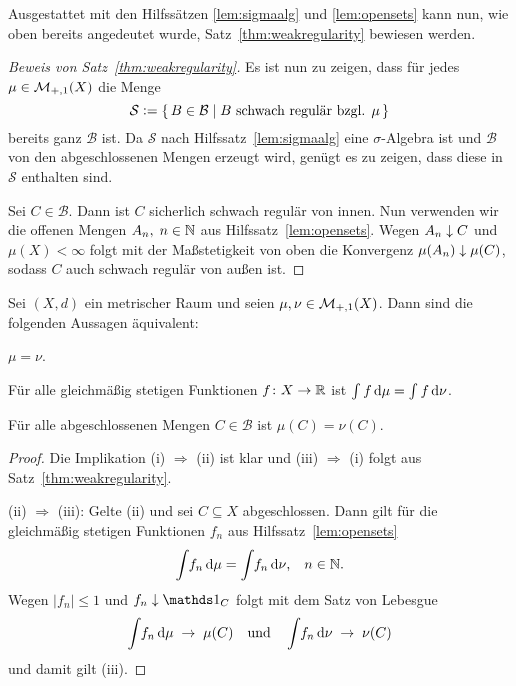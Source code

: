 \documentclass[../main/main.tex]{subfiles}
\begin{document}
	Ausgestattet mit den Hilfssätzen \ref{lem:sigmaalg} und \ref{lem:opensets} kann nun, 
	wie oben bereits angedeutet wurde, Satz~\ref{thm:weakregularity} bewiesen werden.

	\begin{proof}[Beweis von Satz~\ref{thm:weakregularity}]
		Es ist nun zu zeigen, dass für jedes $\mu \in \mathcal{M}_{+,1}(X)$
		die Menge 
		$$\mathcal{S} \vcentcolon = \left\{\, B \in \mathcal{B} \; | \; B \text{ schwach regulär bzgl. } \mu \,\right\}$$
		bereits ganz $\mathcal{B}$ ist. 
		Da $\mathcal{S}$ nach Hilfssatz~\ref{lem:sigmaalg} eine $\sigma$-Algebra ist und 
		$\mathcal{B}$ von den abgeschlossenen Mengen erzeugt wird, genügt es zu zeigen, 
		dass diese in $\mathcal{S}$ enthalten sind. 
		
		Sei $C \in \mathcal{B}$. Dann ist $C$ sicherlich schwach regulär von innen. 
		Nun verwenden wir die offenen Mengen $A_n, \; n \in \mathbb{N}$ aus Hilfssatz~\ref{lem:opensets}. 
		Wegen $A_n \downarrow C$ und $\mu(X) < \infty$ folgt mit der Maßstetigkeit von oben die Konvergenz $\mu(A_n) \downarrow \mu(C)$,
		sodass $C$ auch schwach regulär von außen ist.
	\end{proof}

	\begin{Satz}
		Sei $(X,d)$ ein metrischer Raum und seien $\mu, \nu \in \mathcal{M}_{+,1}(X)$. Dann sind die folgenden Aussagen äquivalent:
		\begin{equivalentthm}
			\item $\mu = \nu$.
			\item Für alle gleichmäßig stetigen Funktionen $f \colon X \to \mathbb{R}$ ist
					 $\int_{} \, f \, \mathrm{d}\mu = \int_{} \, f \, \mathrm{d}\nu$.
			\item Für alle abgeschlossenen Mengen $C \in \mathcal{B}$ ist $\mu(C) = \nu(C)$.
		\end{equivalentthm}
	\end{Satz}

	\begin{proof}
		Die Implikation (i) $\Rightarrow$ (ii) ist klar und (iii) $\Rightarrow$ (i) folgt aus Satz~\ref{thm:weakregularity}.
		
		(ii) $\Rightarrow$ (iii): Gelte (ii) und sei $C \subseteq X$ abgeschlossen. 
		Dann gilt für die gleichmäßig stetigen Funktionen $f_n$ aus Hilfssatz~\ref{lem:opensets}
		$$\int_{} \, f_n \, \mathrm{d}\mu = \int_{} \, f_n \, \mathrm{d}\nu\text{,} \quad n \in \mathbb{N} \text{.}$$
		Wegen $| f_n | \leq 1$ und $f_n \convdown \indfct_C$ folgt mit dem Satz von Lebesgue 
		$$\int_{} \, f_n \, \mathrm{d}\mu \; \to \; \mu(C) \quad \text{und} \quad \int_{} \, f_n \, \mathrm{d}\nu 
			\; \to \; \nu(C)$$
		und damit gilt (iii).
	\end{proof}
\end{document}
